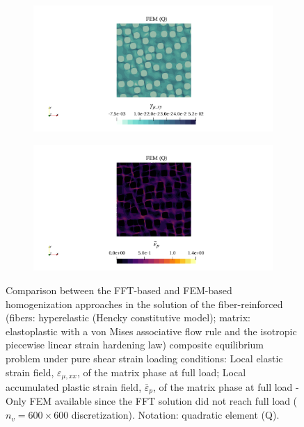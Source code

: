 \begin{figure}[hbt]
  \centering
	\begin{subfigure}[b]{\textwidth}
    \centering
    \includegraphics[width=\textwidth]{figures/von_mises_res_mat_large_strain_2D_shear_elastic_strain_12}
    \caption{}
    \label{subfig:von_mises_res_mat_large_strain_2D_shear_elastic_strain_12}
  \end{subfigure}
  \begin{subfigure}[b]{\textwidth}
    \centering
    \includegraphics[width=\textwidth]{figures/von_mises_res_mat_large_strain_2D_shear_palstic_strain}
    \caption{}
    \label{subfig:von_mises_res_mat_large_strain_2D_shear_palstic_strain}
  \end{subfigure}
  \caption{Comparison between the FFT-based and FEM-based homogenization approaches in the
  solution of the fiber-reinforced (fibers: hyperelastic (Hencky constitutive model); matrix: elastoplastic with a von Mises associative flow rule and the isotropic piecewise linear strain hardening law) composite equilibrium problem under pure shear strain loading conditions:  Local elastic strain field, \(\varepsilon_{\mu,xx}\), of the matrix phase at full load;  Local accumulated plastic strain field, \(\bar{\varepsilon}_{p}\), of the matrix phase at full load  - Only FEM available since the FFT solution did not reach full load (\(n_v = 600 \times 600\) discretization). Notation: quadratic element (Q).}
\label{fig:von_mises_res_mat_large_strain_2D_shear_local_fields}
\end{figure}

